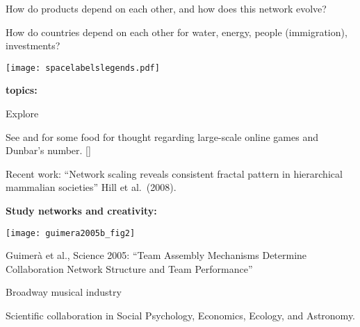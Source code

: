         How do products depend on each other, and how does this network evolve?
       
        How do countries depend on
        each other for water, energy, people (immigration), investments?
            
      
      \texttt{[image: spacelabelslegends.pdf]}
        

  
      \textbf{topics:}

    
      
       
        Explore 
      
        See
        and 
        for some food for thought regarding large-scale online games and Dunbar's number.
        []
       
        Recent work:
        ``Network scaling reveals consistent fractal pattern in hierarchical mammalian societies''
        Hill et al.\ (2008)\cite{hill2008a}.
      
    

  
  \textbf{Study networks and creativity:}

      
    \texttt{[image: guimera2005b\_fig2]}
    
    
    
      Guimer\`{a} et al., Science 2005:\cite{guimera2005b}
      ``Team Assembly Mechanisms Determine Collaboration Network Structure and Team Performance''
     
      Broadway musical industry
     
      Scientific collaboration in Social Psychology, Economics, Ecology, and Astronomy.
    
  



